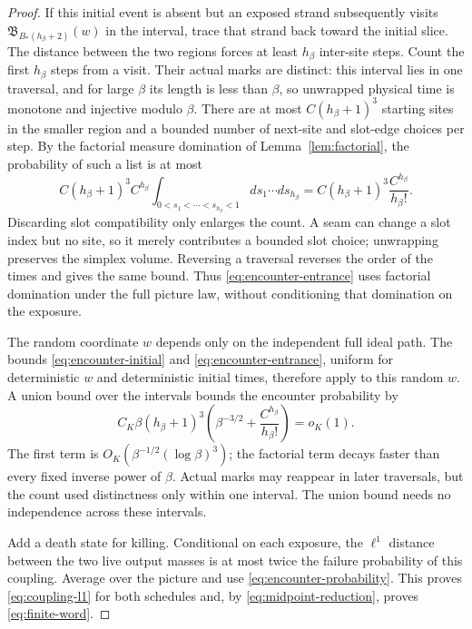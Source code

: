 \begin{proof}
If this initial event is absent but an exposed strand subsequently
visits \(\mathfrak B_{B_*(h_\beta+2)}(w)\) in the interval, trace
that strand back toward the initial slice. The distance between the
two regions forces at least \(h_\beta\) inter-site steps. Count the
first \(h_\beta\) steps from a visit. Their actual marks are distinct:
this interval lies in one traversal, and for large \(\beta\) its
length is less than \(\beta\), so unwrapped physical time is monotone
and injective modulo \(\beta\). There are at most
\(C(h_\beta+1)^3\) starting sites in the smaller region and a bounded
number of next-site and slot-edge choices per step. By the factorial
measure domination of Lemma~\ref{lem:factorial}, the probability of
such a list is at most
\begin{equation}\label{eq:encounter-entrance}
 C(h_\beta+1)^3 C^{h_\beta}
  \int_{0<s_1<\cdots<s_{h_\beta}<1}ds_1\cdots ds_{h_\beta}
 =C(h_\beta+1)^3\frac{C^{h_\beta}}{h_\beta!}.
\end{equation}
Discarding slot compatibility only enlarges the count. A seam can
change a slot index but no site, so it merely contributes a bounded
slot choice; unwrapping preserves the simplex volume. Reversing a
traversal reverses the order of the times and gives the same bound.
Thus \eqref{eq:encounter-entrance} uses factorial domination under the
full picture law, without conditioning that domination on the exposure.

The random coordinate \(w\) depends only on the independent full ideal
path. The bounds \eqref{eq:encounter-initial} and
\eqref{eq:encounter-entrance}, uniform for deterministic \(w\) and
deterministic initial times, therefore apply to this random \(w\).
A union bound over the intervals bounds the encounter probability by
\begin{equation}\label{eq:encounter-probability}
 C_K\beta(h_\beta+1)^3
       \left(\beta^{-3/2}+\frac{C^{h_\beta}}{h_\beta!}\right)
 =o_K(1).
\end{equation}
The first term is \(O_K(\beta^{-1/2}(\log\beta)^3)\); the factorial
term decays faster than every fixed inverse power of \(\beta\).
Actual marks may reappear in later traversals, but the count used
distinctness only within one interval. The union bound needs no
independence across these intervals.

Add a death state for killing. Conditional on each exposure, the
\(\ell^1\) distance between the two live output masses is at most
twice the failure probability of this coupling. Average over the
picture and use \eqref{eq:encounter-probability}. This proves
\eqref{eq:coupling-l1} for both schedules and, by
\eqref{eq:midpoint-reduction}, proves \eqref{eq:finite-word}.
\end{proof}

